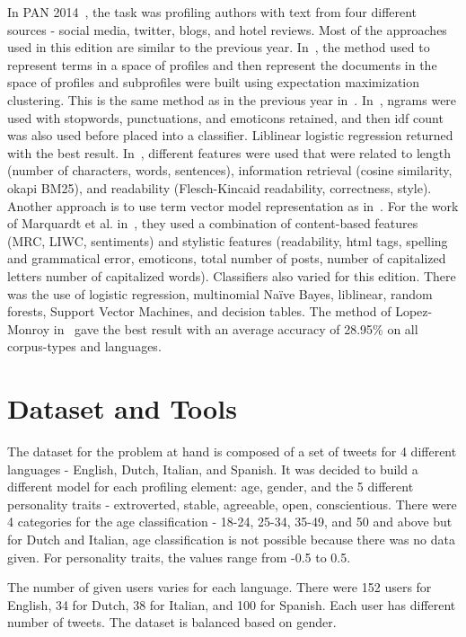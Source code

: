\documentclass[a4paper]{llncs}
\begin{document}
In PAN 2014~\cite{rangel2014overview}, the task was profiling authors with text from four different sources - social media, twitter, blogs, and hotel reviews. Most of the approaches used in this edition are similar to the previous year. In~\cite{lopezusing}, the method used to represent terms in a space of profiles and then represent the documents in the space of profiles and subprofiles were built using expectation maximization clustering. This is the same method as in the previous year in~\cite{lopez2013inaoe}. In~\cite{maharjansimple}, ngrams were used with stopwords, punctuations, and emoticons retained, and then idf count was also used before placed into a classifier. Liblinear logistic regression returned with the best result. In~\cite{weren6exploring}, different features were used that were related to length (number of characters, words, sentences), information retrieval (cosine similarity, okapi BM25), and readability (Flesch-Kincaid readability, correctness, style). Another approach is to use term vector model representation as in~\cite{villenadaedalus}. For the work of Marquardt et al. in~\cite{marquardt2014age}, they used a combination of content-based features (MRC, LIWC, sentiments) and stylistic features (readability, html tags, spelling and grammatical error, emoticons, total number of posts, number of capitalized letters number of capitalized words). Classifiers also varied for this edition. There was the use of logistic regression, multinomial Naïve Bayes, liblinear, random forests, Support Vector Machines, and decision tables. The method of Lopez-Monroy in~\cite{lopezusing} gave the best result with an average accuracy of 28.95\% on all corpus-types and languages. 

\section{Dataset and Tools}
The dataset for the problem at hand is composed of a set of tweets for 4 different languages - English, Dutch, Italian, and Spanish. It was decided to build a different model for each profiling element: age, gender, and the 5 different personality traits - extroverted, stable, agreeable, open, conscientious. There were 4 categories for the age classification - 18-24, 25-34, 35-49, and 50 and above but for Dutch and Italian, age classification is not possible because there was no data given. For personality traits, the values range from -0.5 to 0.5.

The number of given users varies for each language. There were 152 users for English, 34 for Dutch, 38 for Italian, and 100 for Spanish. Each user has different number of tweets. The dataset is balanced based on gender. 
\end{document}
